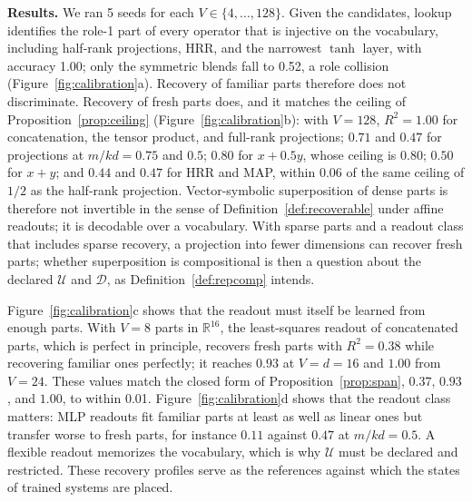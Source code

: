 \documentclass[10pt]{article}
\theoremstyle{plain}
\theoremstyle{remark}
\newcommand{\R}{\mathbb{R}}
\newcommand{\U}{\mathcal{U}}
\newcommand{\D}{\mathcal{D}}
\begin{document}
\textbf{Results.} We ran 5 seeds for each $V \in \{4, \ldots, 128\}$. Given the candidates, lookup identifies the role-1 part of every operator that is injective on the vocabulary, including half-rank projections, HRR, and the narrowest $\tanh$ layer, with accuracy 1.00; only the symmetric blends fall to 0.52, a role collision (Figure~\ref{fig:calibration}a). Recovery of familiar parts therefore does not discriminate. Recovery of fresh parts does, and it matches the ceiling of Proposition~\ref{prop:ceiling} (Figure~\ref{fig:calibration}b): with $V = 128$, $R^2 = 1.00$ for concatenation, the tensor product, and full-rank projections; $0.71$ and $0.47$ for projections at $m/kd = 0.75$ and $0.5$; $0.80$ for $x + 0.5y$, whose ceiling is $0.80$; $0.50$ for $x + y$; and $0.44$ and $0.47$ for HRR and MAP, within 0.06 of the same ceiling of $1/2$ as the half-rank projection. Vector-symbolic superposition of dense parts is therefore not invertible in the sense of Definition~\ref{def:recoverable} under affine readouts; it is decodable over a vocabulary. With sparse parts and a readout class that includes sparse recovery, a projection into fewer dimensions can recover fresh parts; whether superposition is compositional is then a question about the declared $\U$ and $\D$, as Definition~\ref{def:repcomp} intends.

Figure~\ref{fig:calibration}c shows that the readout must itself be learned from enough parts. With $V = 8$ parts in $\R^{16}$, the least-squares readout of concatenated parts, which is perfect in principle, recovers fresh parts with $R^2 = 0.38$ while recovering familiar ones perfectly; it reaches $0.93$ at $V = d = 16$ and $1.00$ from $V = 24$. These values match the closed form of Proposition~\ref{prop:span}, $0.37$, $0.93$, and $1.00$, to within 0.01. Figure~\ref{fig:calibration}d shows that the readout class matters: MLP readouts fit familiar parts at least as well as linear ones but transfer worse to fresh parts, for instance $0.11$ against $0.47$ at $m/kd = 0.5$. A flexible readout memorizes the vocabulary, which is why $\U$ must be declared and restricted. These recovery profiles serve as the references against which the states of trained systems are placed.
\end{document}
